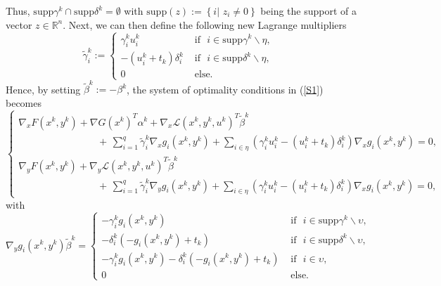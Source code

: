 		Thus, $\mathrm{supp}\gamma^{k}\cap\mathrm{supp}\delta^{k}=\emptyset $ with $\mathrm{supp}(z) := \left\lbrace i |\,\, z_i \neq 0\right\rbrace $ being  the support of a vector $z \in \mathbb{R}^n.$ Next, we can then define the following new Lagrange multipliers
	\begin{equation}\label{S8}
	\tilde{\gamma}_{i}^{k}:=\left\{
	\begin{array}{lll}
	\gamma_{i}^{k}u_{i}^{k} & \mbox{ if } \,\,i\in\mathrm{supp}\gamma^{k}\backslash\eta,&\\
	-(u_{i}^{k}+t_{k})\delta_{i}^{k} & \mbox{ if }\,\, i\in\mathrm{supp}\delta^{k}\backslash\eta,&\\
	0& \mbox{ else. }&
	\end{array}
	\right.
	\end{equation}
		Hence, by setting $\tilde{\beta}^{k}:=-\beta^{k}$, the system of optimality conditions in (\ref{S1}) becomes
	\begin{equation}
	\left\{
	\begin{array}{l}
	\nabla_{x}F(x^{k},y^{k})+\nabla G(x^{k})^{T}\alpha^{k}+\nabla_{x}\mathcal{L}(x^{k},y^{k},u^{k})^{T}\tilde{\beta}^{k}\\[0.5ex]
	\qquad \qquad \qquad \qquad +\, \sum\limits_{i=1}^{q}\tilde{\gamma}_{i}
	^{k}\nabla_{x}g_{i}(x^{k},y^{k}) + \sum\limits_{i\in\eta
	}\left( \gamma_{i}^{k} u_{i}^{k}-(u_{i}^{k}+t_{k})\delta_{i}^{k}\right)   \nabla_{x}g_{i}(x^{k},y^{k})=0,\\[1ex]
	\nabla_{y}F(x^{k},y^{k})+\nabla_{y}\mathcal{L}(x^{k},y^{k},u^{k})^{T}\tilde{\beta}^{k}\\
        \qquad \qquad \qquad \qquad +\,\sum\limits_{i=1}^{q}\tilde{\gamma}_{i}^{k}\nabla_{y}g_{i}(x^{k},y^{k})+\sum\limits_{i\in\eta}\left( \gamma_{i}^{k} u_{i}^{k}-(u_{i}^{k}+t_{k})\delta_{i}^{k}\right)  \nabla_{x}g_{i}(x^{k},y^{k}) =0,
	\end{array}
	\right. \label{S10}
	\end{equation}
	with
	\begin{equation}
	\nabla_{y}g_{i}(x^{k},y^{k})\tilde{\beta}^{k}=\left\{
	\begin{array}{lll}
	-\gamma_{i}^{k}g_{i}(x^{k},y^{k})& \mbox{ if }\,\, i\in\mathrm{supp}\gamma^{k}\backslash\upsilon,&\\
	-\delta _{i}^{k}(-g_{i}(x^{k},y^{k})+t_{k})& \mbox{ if }\,\, i\in\mathrm{supp}\delta^{k}\backslash\upsilon,& \\
	-\gamma
	_{i}^{k}g_{i}(x^{k},y^{k})-\delta _{i}^{k}(-g_{i}(x^{k},y^{k})+t_{k})  & \mbox{ if }\,\,  i\in \upsilon,&  \\
	0 & \mbox{ else. } &
	\end{array}
	\right. \label{S11}
	\end{equation}
